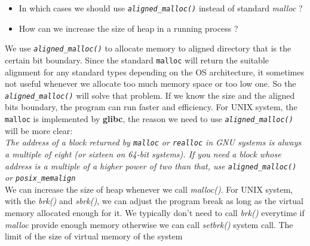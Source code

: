 \documentclass[a4paper]{article}
\begin{document}
\begin{itemize}
    \item In which cases we should use \textit{\texttt{aligned\_malloc()}} instead of standard \textit{malloc} ?
    \item How can we increase the size of heap in a running process ?
\end{itemize}

    We use \textit{\texttt{aligned\_malloc()}} to allocate memory to aligned directory that is the certain bit boundary. Since the standard \texttt{malloc} will return the suitable alignment for any standard types depending on the OS architecture, it sometimes not useful whenever we allocate too much memory space or too low one. So the \textit{\texttt{aligned\_malloc()}} will solve that problem. If we know the size and the aligned bits boundary, the program can run faster and efficiency. For UNIX system, the \texttt{malloc} is implemented by \textbf{glibc}, the reason we need to use \textit{\texttt{aligned\_malloc()}} will be more clear: \\

    \indent \textit{The address of a block returned by \texttt{malloc} or \texttt{realloc} in GNU systems is always a multiple of eight (or sixteen on 64-bit systems). If you need a block whose address is a multiple of a higher power of two than that, use \textit{\texttt{aligned\_malloc()}} or \textit{\texttt{posix\_memalign}}} \\

    \indent We can increase the size of heap whenever we call \textit{malloc()}. For UNIX system, with the \textit{brk()} and \textit{sbrk()}, we can adjust the program break as long as the virtual memory allocated enough for it. We typically don't need to call \textit{brk()} everytime if \textit{malloc} provide enough memory otherwise we can call \textit{setbrk()} system call. The limit of the size of virtual memory of the system

\bigbreak
\end{document}

